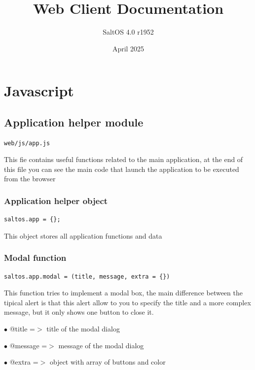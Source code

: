 \documentclass[a4paper]{article}
\title{Web Client Documentation}
\author{SaltOS 4.0 r1952}
\begin{document}
\date{April 2025}
\maketitle
\clearpage

\tableofcontents
\clearpage


\hypertarget{toc1}{}
\section{Javascript}

\hypertarget{toc2}{}
\subsection{Application helper module}

\begin{lstlisting}
web/js/app.js
\end{lstlisting}

This fie contains useful functions related to the main application, at the end of this file you
can see the main code that launch the application to be executed from the browser

\hypertarget{toc3}{}
\subsubsection{Application helper object}

\begin{lstlisting}
saltos.app = {};
\end{lstlisting}

This object stores all application functions and data

\hypertarget{toc4}{}
\subsubsection{Modal function}

\begin{lstlisting}
saltos.app.modal = (title, message, extra = {})
\end{lstlisting}

This function tries to implement a modal box, the main difference between the tipical alert
is that this alert allow to you to specify the title and a more complex message, but it only
shows one button to close it.

\begin{compactitem}
\item[\color{myblue}$\bullet$] @title   =$>$ title of the modal dialog
\item[\color{myblue}$\bullet$] @message =$>$ message of the modal dialog
\item[\color{myblue}$\bullet$] @extra   =$>$ object with array of buttons and color
\end{compactitem}
\end{document}
